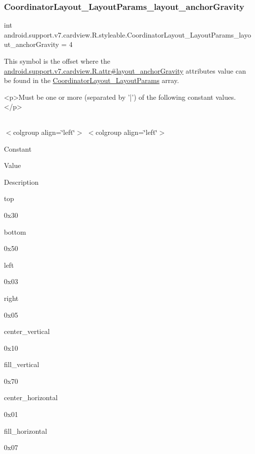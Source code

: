 \subsubsection{\texorpdfstring{Coordinator\+Layout\+\_\+\+Layout\+Params\+\_\+layout\+\_\+anchor\+Gravity}{CoordinatorLayout\_LayoutParams\_layout\_anchorGravity}}
{\footnotesize\ttfamily int android.\+support.\+v7.\+cardview.\+R.\+styleable.\+Coordinator\+Layout\+\_\+\+Layout\+Params\+\_\+layout\+\_\+anchor\+Gravity = 4\hspace{0.3cm}{\ttfamily [static]}}

This symbol is the offset where the \hyperlink{classandroid_1_1support_1_1v7_1_1cardview_1_1R_1_1attr_a25058deb29377972d2da6be407edfddc}{android.\+support.\+v7.\+cardview.\+R.\+attr\#layout\+\_\+anchor\+Gravity} attribute\textquotesingle{}s value can be found in the \hyperlink{classandroid_1_1support_1_1v7_1_1cardview_1_1R_1_1styleable_afac1c5752b8eb35d30db48df7a9eea89}{Coordinator\+Layout\+\_\+\+Layout\+Params} array.

\begin{DoxyVerb}      <p>Must be one or more (separated by '|') of the following constant values.</p>
\end{DoxyVerb}
 \tabulinesep=1mm
\begin{longtabu} spread 0pt [c]{*{0}{|X[-1]}|}
\hline
\end{longtabu}
$<$colgroup align=\char`\"{}left\char`\"{}$>$ $<$colgroup align=\char`\"{}left\char`\"{}$>$ 

Constant

Value

Description 

{\ttfamily top}

0x30

{\ttfamily bottom}

0x50

{\ttfamily left}

0x03

{\ttfamily right}

0x05

{\ttfamily center\+\_\+vertical}

0x10

{\ttfamily fill\+\_\+vertical}

0x70

{\ttfamily center\+\_\+horizontal}

0x01

{\ttfamily fill\+\_\+horizontal}

0x07

